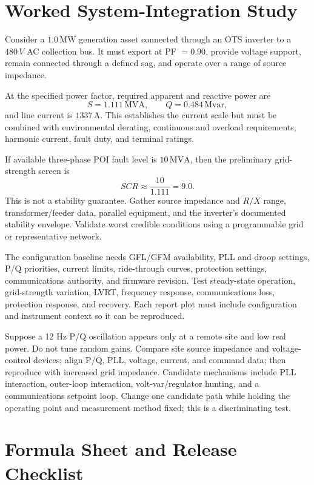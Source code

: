 \documentclass[11pt]{article}
\newcommand{\A}{\mathrm{A}}
\newcommand{\MW}{\mathrm{MW}}
\newcommand{\MVA}{\mathrm{MVA}}
\newcommand{\Mvar}{\mathrm{Mvar}}
\begin{document}
\section{Worked System-Integration Study}

Consider a $1.0\,\MW$ generation asset connected through an OTS inverter to a
$480\,V$ AC collection bus. It must export at PF $=0.90$, provide voltage
support, remain connected through a defined sag, and operate over a range of
source impedance.

At the specified power factor, required apparent and reactive power are
\[
S=1.111\,\MVA,\qquad Q=0.484\,\Mvar,
\]
and line current is $1337\,\A$. This establishes the current scale but must be
combined with environmental derating, continuous and overload requirements,
harmonic current, fault duty, and terminal ratings.

If available three-phase POI fault level is $10\,\MVA$, then the preliminary
grid-strength screen is
\[
SCR\approx\frac{10}{1.111}=9.0.
\]
This is not a stability guarantee. Gather source impedance and $R/X$ range,
transformer/feeder data, parallel equipment, and the inverter's documented
stability envelope. Validate worst credible conditions using a programmable
grid or representative network.

The configuration baseline needs GFL/GFM availability, PLL and droop settings,
P/Q priorities, current limits, ride-through curves, protection settings,
communications authority, and firmware revision. Test steady-state operation,
grid-strength variation, LVRT, frequency response, communications loss,
protection response, and recovery. Each report plot must include configuration
and instrument context so it can be reproduced.

Suppose a 12 Hz P/Q oscillation appears only at a remote site and low real
power. Do not tune random gains. Compare site source impedance and voltage-
control devices; align P/Q, PLL, voltage, current, and command data; then
reproduce with increased grid impedance. Candidate mechanisms include PLL
interaction, outer-loop interaction, volt-var/regulator hunting, and a
communications setpoint loop. Change one candidate path while holding the
operating point and measurement method fixed; this is a discriminating test.

\section{Formula Sheet and Release Checklist}
\end{document}
